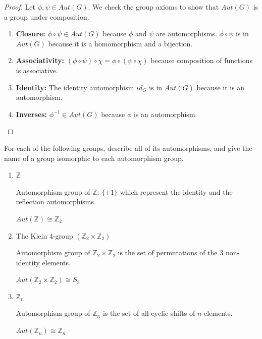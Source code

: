 \documentclass{article}
\theoremstyle{plain} %
\theoremstyle{definition} %
\begin{document}
\begin{proof}
    Let $\phi, \psi \in Aut(G)$.
    We check the group axioms to show that $Aut(G)$ is a group under composition.
    \begin{enumerate}[label=\roman*.]
        \item \textbf{Closure:} $\phi \circ \psi \in Aut(G)$ because $\phi$ and $\psi$ are automorphisms.
            $\phi \circ \psi$ is in $Aut(G)$ because it is a homomorphism and a bijection.

        \item \textbf{Associativity:} $(\phi \circ \psi) \circ \chi = \phi \circ (\psi \circ \chi)$ because composition of functions is associative.
        \item \textbf{Identity:} The identity automorphism $id_G$ is in $Aut(G)$ because it is an automorphism.
        \item \textbf{Inverses:} $\phi^{-1} \in Aut(G)$ because $\phi$ is an automorphism.
    \end{enumerate}

    

\end{proof}

\noindent{} For each of the following groups, describe all of its automorphisms, and
give the name of a group isomorphic to each automorphism group.

\begin{enumerate}[label=\roman*.]
    \item $\mathbb{Z}$

    Automorphism group of $\mathbb{Z}$: $\{\pm 1\}$ which represent the identity and the reflection automorphisms.

    $Aut(\mathbb{Z}) \cong \mathbb{Z}_2$
    \item The Klein 4-group $(\mathbb{Z}_2 \times \mathbb{Z}_2)$

    Automorphism group of $\mathbb{Z}_2 \times \mathbb{Z}_2$ is the set of permutations
        of the 3 non-identity elements.

    $Aut(\mathbb{Z}_2 \times \mathbb{Z}_2) \cong S_3$

    \item $\mathbb{Z}_n$

    Automorphism group of $\mathbb{Z}_n$ is the set of all cyclic shifts of $n$ elements.

    $Aut(\mathbb{Z}_n) \cong \mathbb{Z}_n$
\end{enumerate}
\end{document}
